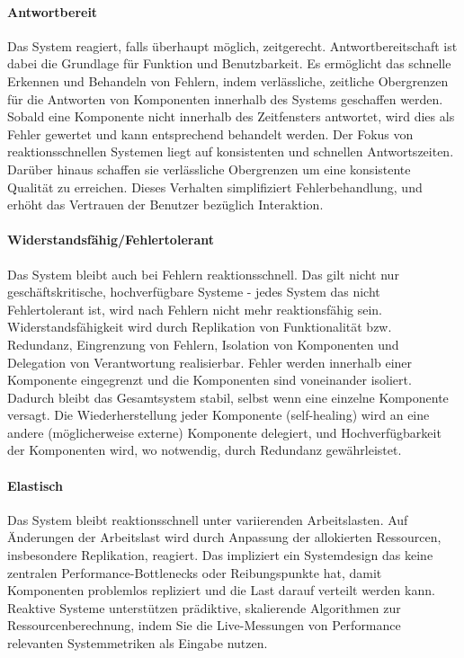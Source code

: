 \paragraph{Antwortbereit}Das System reagiert, falls überhaupt möglich, zeitgerecht. Antwortbereitschaft ist dabei die Grundlage für Funktion und
Benutzbarkeit. Es ermöglicht das schnelle Erkennen und Behandeln von Fehlern, indem verlässliche, zeitliche Obergrenzen für die Antworten von
Komponenten innerhalb des Systems geschaffen werden. Sobald eine Komponente nicht innerhalb des Zeitfensters antwortet, wird dies als Fehler gewertet und kann
entsprechend behandelt werden.
Der Fokus von reaktionsschnellen Systemen liegt auf konsistenten und schnellen Antwortszeiten. Darüber hinaus schaffen sie
verlässliche Obergrenzen um eine konsistente Qualität zu erreichen.
Dieses Verhalten simplifiziert Fehlerbehandlung, und erhöht das Vertrauen der Benutzer bezüglich Interaktion.

\paragraph{Widerstandsfähig/Fehlertolerant}Das System bleibt auch bei Fehlern reaktionsschnell. Das gilt nicht nur geschäftskritische, hochverfügbare Systeme -
jedes System das nicht Fehlertolerant ist, wird nach Fehlern nicht mehr reaktionsfähig sein.
Widerstandsfähigkeit wird durch Replikation von Funktionalität bzw. Redundanz, Eingrenzung von Fehlern, Isolation von Komponenten und
Delegation von Verantwortung realisierbar.
Fehler werden innerhalb einer Komponente eingegrenzt und die Komponenten sind voneinander isoliert. Dadurch bleibt das Gesamtsystem stabil, selbst
wenn eine einzelne Komponente versagt.
Die Wiederherstellung jeder Komponente (self-healing) wird an eine andere (möglicherweise externe) Komponente delegiert, und
Hochverfügbarkeit der Komponenten wird, wo notwendig, durch Redundanz gewährleistet.

\paragraph{Elastisch}Das System bleibt reaktionsschnell unter variierenden Arbeitslasten. Auf Änderungen der Arbeitslast wird durch
Anpassung der allokierten Ressourcen, insbesondere Replikation, reagiert. Das impliziert ein Systemdesign das keine zentralen Performance-Bottlenecks oder
Reibungspunkte hat, damit Komponenten problemlos repliziert und die Last darauf verteilt werden kann.
Reaktive Systeme unterstützen prädiktive, skalierende Algorithmen zur Ressourcenberechnung,
indem Sie die Live-Messungen von Performance relevanten Systemmetriken als Eingabe nutzen.


